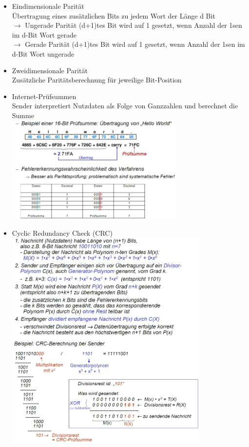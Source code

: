 \documentclass{scrreprt}
\begin{document}
\begin{itemize}
	\item Eindimensionale Parität
	\\Übertragung eines zusätzlichen Bits zu jedem Wort der Länge d Bit
	\\$\rightarrow$ Ungerade Parität (d+1)tes Bit wird auf 1 gesetzt, wenn Anzahl der 1sen im d-Bit Wort gerade
	\\$\rightarrow$ Gerade Parität (d+1)tes Bit wird auf 1 gesetzt, wenn Anzahl der 1sen im d-Bit Wort ungerade
	\item Zweidimensionale Parität
	\\Zusätzliche Paritätsberechnung für jeweilige Bit-Position
	\item Internet-Prüfsummen
	\\ Sender interpretiert Nutzdaten als Folge von Ganzzahlen und berechnet die Summe
	\\\includegraphics[width=0.70\textwidth]{"graphics/prufsum"}
	\item Cyclic Redundancy Check (CRC)
	\\\includegraphics[width=0.80\textwidth]{"graphics/CRC"}
\end{itemize}
\end{document}

